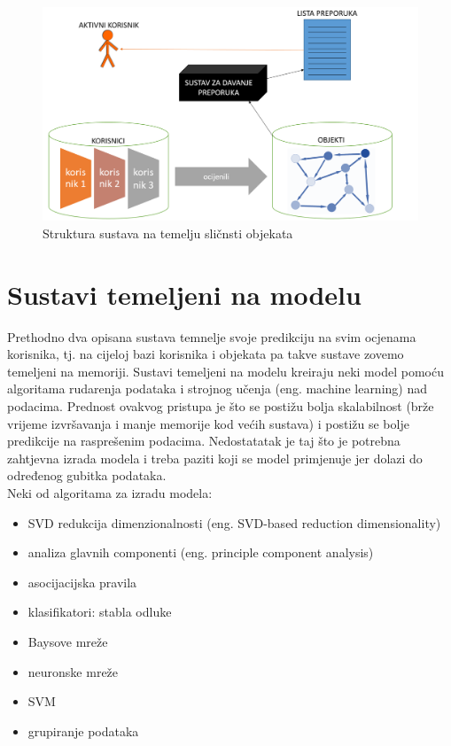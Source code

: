 \documentclass[a4paper,oneside,12pt]{memoir} %
\begin{document}
\begin{figure}
\begin{center}
\includegraphics[scale=0.4]{slike/item-based.png}
\caption{Struktura sustava na temelju sličnsti objekata}
\end{center}
\end{figure}
%
\section{Sustavi temeljeni na modelu}
%
Prethodno dva opisana sustava temnelje svoje predikciju na svim ocjenama korisnika, tj. na cijeloj bazi korisnika i objekata pa takve sustave zovemo temeljeni na memoriji. Sustavi temeljeni na modelu kreiraju neki model pomoću algoritama rudarenja podataka  i strojnog učenja (eng. machine learning) nad podacima. Prednost ovakvog pristupa je što se postižu bolja skalabilnost (brže vrijeme izvršavanja i manje memorije kod većih sustava) i postižu se bolje predikcije na rasprešenim podacima. Nedostatatak je taj što je potrebna zahtjevna izrada modela i treba paziti koji se model primjenuje jer dolazi do određenog gubitka podataka.
\bigskip
\\ Neki od algoritama za izradu modela:
\begin{itemize}
\item SVD redukcija dimenzionalnosti (eng. SVD-based reduction dimensionality)
\item analiza glavnih componenti (eng. principle component analysis)
\item asocijacijska pravila
\item klasifikatori: stabla odluke
\item 	Baysove mreže
\item 	neuronske mreže
\item 	SVM
\item grupiranje podataka
\end{itemize}
%
\end{document}
